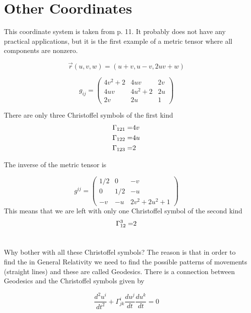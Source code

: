 {\section{Other Coordinates}
This coordinate system is taken from \cite{night} p. 11. It 
probably does not have any practical applications, but it is the first
example of a metric tensor where all components are nonzero.

$$
    \vec{r}(u,v,w) = (u+v, u-v, 2uv + w)
$$

$$
   g_{ij} = \begin{pmatrix}
               4v^2 +2 & 4uv & 2v \\
               4uv & 4u^2 + 2 & 2u \\
               2v & 2u & 1
            \end{pmatrix}
$$

There are only three Christoffel symbols of the first kind
\begin{eqnarray*}
\Gamma_{121}=&4v \\
\Gamma_{122}=&4u \\
\Gamma_{123}=&2
\end{eqnarray*}

The inverse of the metric tensor is

$$
   g^{ij} = \begin{pmatrix}
               1/2  & 0  & -v \\
               0 & 1/2 & -u  \\
               -v & -u & 2v^2 + 2u^2+1 
            \end{pmatrix}
$$
This means that we are left with only one Christoffel symbol of the second kind
\begin{eqnarray*}
\Gamma_{12}^{3}=&2 \\
\end{eqnarray*}

\section{}

Why bother with all these Christoffel symbols? The reason is that in order to find
the  in General Relativity we need to find the possible 
patterns of movements (straight lines) and these are called Geodesics. There is a connection between
Geodesics and the Christoffel symbols given by 

$$
    \frac{d^2u^i}{dt^2} + \Gamma_{jk}^i\frac{du^j}{dt}\frac{du^k}{dt} = 0
$$

}
